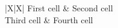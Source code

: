 \documentclass{article}
\begin{document}
\begin{tabu}{|X|X|}
\hline
First cell & Second cell \\
\hline
Third cell & Fourth cell \\
\hline
\end{tabu}
\end{document}
